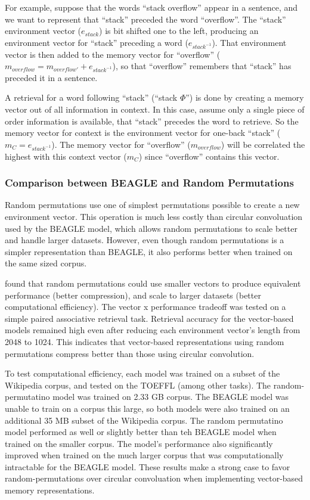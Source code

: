 \documentclass[man,floatsintext]{apa6}
\begin{document}
For example, suppose that the words ``stack overflow'' appear in a sentence, and we want to represent that ``stack'' preceded the word ``overflow''.
The ``stack'' environment vector ($e_{stack}$) is bit shifted one to the left, producing an environment vector for ``stack'' preceding a word ($e_{stack^{-1}}$).
That environment vector is then added to the memory vector for ``overflow'' ($m_{overflow} = m_{overflow'} + e_{stack^{-1}}$), so that ``overflow'' remembers that ``stack'' has preceded it in a sentence.

A retrieval for a word following ``stack'' (``stack $\Phi$'') is done by creating a memory vector out of all information in context.
In this case, assume only a single piece of order information is available, that ``stack'' precedes the word to retrieve.
So the memory vector for context is the environment vector for one-back ``stack'' ($m_{C} = e_{stack^{-1}}$).
The memory vector for ``overflow'' ($m_{overflow}$) will be correlated the highest with this context vector ($m_{C}$) since ``overflow'' contains this vector.

\subsubsection{Comparison between BEAGLE and Random Permutations}

Random permutations use one of simplest permutations possible to create a new environment vector.
This operation is much less costly than circular convoluation used by the BEAGLE model, which allows random permutations to scale better and handle larger datasets.
However, even though random permutations is a simpler representation than BEAGLE, it also performs better when trained on the same sized corpus. 

\textcite{Recchia2010} found that random permutations could use smaller vectors to produce equivalent performance (better compression), and scale to larger datasets (better computational efficiency).
The vector x performance tradeoff was tested on a simple paired associative retrieval task. 
Retrieval accuracy for the vector-based models remained high even after reducing each environment vector's length from \num{2048} to \num{1024}.
This indicates that vector-based representations using random permutations compress better than those using circular convolution.

To test computational efficiency, each model was trained on a subset of the Wikipedia corpus, and tested on the TOEFFL (among other tasks).
The random-permutatino model was trained on \num{2.33} GB corpus.
The BEAGLE model was unable to train on a corpus this large, so both models were also trained on an additional \num{35} MB subset of the Wikipedia corpus.
The random permutatino model performed as well or slightly better than teh BEAGLE model when trained on the smaller corpus.
The model's performance also significantly improved when trained on the much larger corpus that was computationally intractable for the BEAGLE model.
These results make a strong case to favor random-permutations over circular convoluation when implementing vector-based memory representations.
\end{document}

